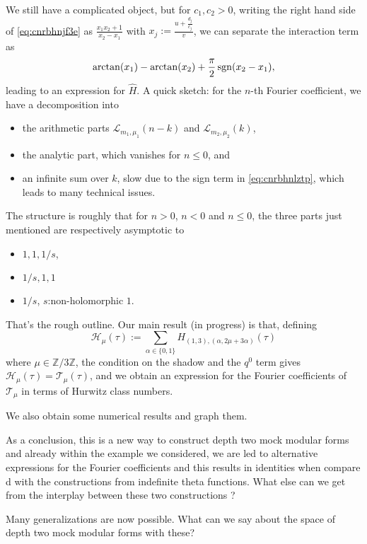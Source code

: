 \documentclass[reqno]{amsart} 
\numberwithin{theorem}{section}
\numberwithin{equation}{section}
\begin{document}
We still have a complicated object, but for $c_1, c_2 > 0$, writing the right hand side of \eqref{eq:cnrbhnjf3e} as $\frac{x_1 x_2 + 1}{ x_2 - x_1}$ with $x_j := \frac{u + \tfrac{d_j}{c_j}}{v}$, we can separate the interaction term as
\begin{equation}\label{eq:cnrbhnlztp}
  \arctan(x_1) - \arctan(x_2) + \frac{\pi}{2} \operatorname{sgn}(x_2 - x_1),
\end{equation}
leading to an expression for $\hat{H}$.  A quick sketch: for the $n$-th Fourier coefficient, we have a decomposition into
\begin{itemize}
\item the arithmetic parts $\mathcal{L}_{m_1, \mu_1}(n - k)$ and $\mathcal{L}_{m_2, \mu_2}(k)$, 
\item the analytic part, which vanishes for $n \leq 0$, and
\item an infinite sum over $k$, slow due to the sign term in \eqref{eq:cnrbhnlztp}, which leads to many technical issues.
\end{itemize}
The structure is roughly that for $n > 0$, $n < 0$ and $n \leq 0$, the three parts just mentioned are respectively asymptotic to
\begin{itemize}
\item $1, 1, 1/s$,
\item $1/s, 1, 1$
\item $1/s$, $s$:non-holomorphic $1$.
\end{itemize}
That's the rough outline.  Our main result (in progress) is that, defining
\begin{equation*}
  \mathcal{H}_\mu(\tau) := \sum_{\alpha \in \{0, 1\}} H_{(1, 3),(\alpha, 2 \mu + 3 \alpha)}(\tau)
\end{equation*}
where $\mu \in \mathbb{Z} / 3 \mathbb{Z}$, the condition on the shadow and the $q^0$ term gives $\mathcal{H}_\mu(\tau) = \mathcal{T}_\mu(\tau)$, and we obtain an expression for the Fourier coefficients of $\mathcal{T}_\mu$ in terms of Hurwitz class numbers.

We also obtain some numerical results and graph them.

As a conclusion, this is a new way to construct depth two mock modular forms and already within the example we considered, we are led to alternative expressions for the Fourier coefficients and this results in identities when compare d with the constructions from indefinite theta functions.  What else can we get from the interplay between these two constructions ?

Many generalizations are now possible.  What can we say about the space of depth two mock modular forms with these?
\end{document}
